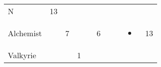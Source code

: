 \documentclass[12pt]{article}
\begin{document}
\begin{longtable}[]{@{}llllllllll@{}}
\begin{minipage}[t]{0.07\columnwidth}
N
\strut\end{minipage} &
\begin{minipage}[t]{0.08\columnwidth}\raggedright\strut
13
\strut\end{minipage}\tabularnewline
\begin{minipage}[t]{0.13\columnwidth}\raggedright\strut
Alchemist
\strut\end{minipage} &
\begin{minipage}[t]{0.06\columnwidth}\raggedright\strut
\strut\end{minipage} &
\begin{minipage}[t]{0.06\columnwidth}\raggedright\strut
7
\strut\end{minipage} &
\begin{minipage}[t]{0.06\columnwidth}\raggedright\strut
\strut\end{minipage} &
\begin{minipage}[t]{0.06\columnwidth}\raggedright\strut
\strut\end{minipage} &
\begin{minipage}[t]{0.06\columnwidth}\raggedright\strut
6
\strut\end{minipage} &
\begin{minipage}[t]{0.06\columnwidth}\raggedright\strut
\strut\end{minipage} &
\begin{minipage}[t]{0.06\columnwidth}\raggedright\strut
\strut\end{minipage} &
\begin{minipage}[t]{0.07\columnwidth}\raggedright\strut
\begin{itemize}
\item
\end{itemize}
\strut\end{minipage} &
\begin{minipage}[t]{0.08\columnwidth}\raggedright\strut
13
\strut\end{minipage}\tabularnewline
\begin{minipage}[t]{0.13\columnwidth}\raggedright\strut
Valkyrie
\strut\end{minipage} &
\begin{minipage}[t]{0.06\columnwidth}\raggedright\strut
\strut\end{minipage} &
\begin{minipage}[t]{0.06\columnwidth}\raggedright\strut
\strut\end{minipage} &
\begin{minipage}[t]{0.06\columnwidth}\raggedright\strut
1

\end{minipage}
\end{longtable}
\end{document}
